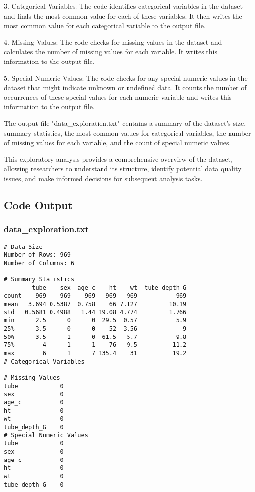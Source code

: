 \documentclass[11pt]{article}
\begin{document}
3. Categorical Variables: The code identifies categorical variables in the dataset and finds the most common value for each of these variables. It then writes the most common value for each categorical variable to the output file.

4. Missing Values: The code checks for missing values in the dataset and calculates the number of missing values for each variable. It writes this information to the output file.

5. Special Numeric Values: The code checks for any special numeric values in the dataset that might indicate unknown or undefined data. It counts the number of occurrences of these special values for each numeric variable and writes this information to the output file.

The output file "data\_exploration.txt" contains a summary of the dataset's size, summary statistics, the most common values for categorical variables, the number of missing values for each variable, and the count of special numeric values.

This exploratory analysis provides a comprehensive overview of the dataset, allowing researchers to understand its structure, identify potential data quality issues, and make informed decisions for subsequent analysis tasks.

\subsection{Code Output}

\subsubsection*{data\_exploration.txt}

\begin{Verbatim}[tabsize=4]
# Data Size
Number of Rows: 969
Number of Columns: 6

# Summary Statistics
        tube    sex  age_c    ht    wt  tube_depth_G
count    969    969    969   969   969           969
mean   3.694 0.5387  0.758    66 7.127         10.19
std   0.5681 0.4988   1.44 19.08 4.774         1.766
min      2.5      0      0  29.5  0.57           5.9
25%      3.5      0      0    52  3.56             9
50%      3.5      1      0  61.5   5.7           9.8
75%        4      1      1    76   9.5          11.2
max        6      1      7 135.4    31          19.2
# Categorical Variables

# Missing Values
tube            0
sex             0
age_c           0
ht              0
wt              0
tube_depth_G    0
# Special Numeric Values
tube            0
sex             0
age_c           0
ht              0
wt              0
tube_depth_G    0
\end{Verbatim}
\end{document}

